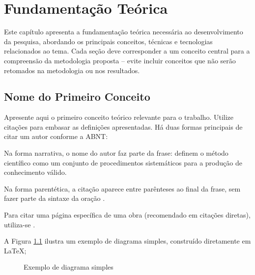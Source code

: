 \chapter{Fundamentação Teórica}
\label{cap:FundamentacaoTeorica}

Este capítulo apresenta a fundamentação teórica necessária ao desenvolvimento da pesquisa, abordando os principais conceitos, técnicas e tecnologias relacionados ao tema. Cada seção deve corresponder a um conceito central para a compreensão da metodologia proposta -- evite incluir conceitos que não serão retomados na metodologia ou nos resultados.

\section{Nome do Primeiro Conceito}

Apresente aqui o primeiro conceito teórico relevante para o trabalho. Utilize citações para embasar as definições apresentadas. Há duas formas principais de citar um autor conforme a ABNT:

Na forma narrativa, o nome do autor faz parte da frase:  definem o método científico como um conjunto de procedimentos sistemáticos para a produção de conhecimento válido.

Na forma parentética, a citação aparece entre parênteses ao final da frase, sem fazer parte da sintaxe da oração \cite{marconi2017metodologia}.

Para citar uma página específica de uma obra (recomendado em citações diretas), utiliza-se .

A Figura \ref{fig:exemplo} ilustra um exemplo de diagrama simples, construído diretamente em \LaTeX{};

\begin{figure}[H]
    \centering
    \caption{Exemplo de diagrama simples}
    \label{fig:exemplo}
    \centering
\end{figure}

